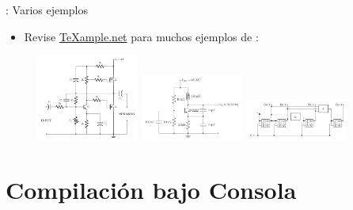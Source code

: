 \documentclass[draft]{beamer}
\begin{document}
\begin{frame}[fragile]{\insertsection: Varios ejemplos}
  \begin{itemize}
  \item Revise
    \href{http://texample.net}{\TeX{}ample.net} para
    muchos ejemplos de :
  \end{itemize}
  \begin{figure}
    \href{http://texample.net/tikz/examples/mosfet/}{%
      \includegraphics[width=0.3\textwidth]{mosfet}}
    \href{http://texample.net/tikz/examples/collpits/}{%
      \includegraphics[width=0.3\textwidth]{collpits}}
    \href{http://texample.net/tikz/examples/4-bit-counter/}{%
      \includegraphics[width=0.3\textwidth]{4-bit-counter}}
  \end{figure}
\end{frame}

\section{Compilación bajo Consola}
\end{document}
